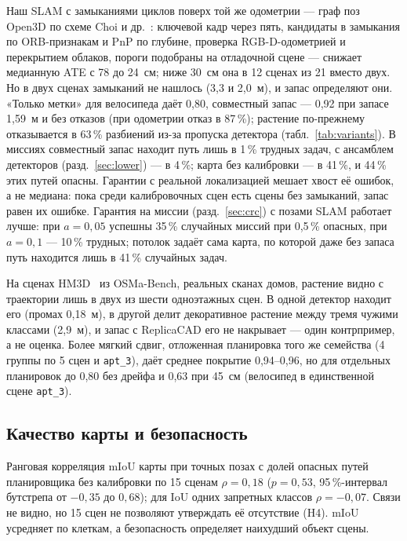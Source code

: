 Наш SLAM с замыканиями циклов поверх той же одометрии --- граф поз Open3D по схеме Choi и др.~\cite{choi2015}: ключевой кадр через пять, кандидаты в замыкания по ORB-признакам и PnP по глубине, проверка RGB-D-одометрией и перекрытием облаков, пороги подобраны на отладочной сцене --- снижает медианную ATE с 78 до 24~см; ниже 30~см она в 12 сценах из 21 вместо двух. Но в двух сценах замыканий не нашлось (3,3 и 2,0~м), и запас определяют они. «Только метки» для велосипеда даёт 0,80, совместный запас --- 0,92 при запасе 1,59~м и без отказов (при одометрии отказ в 87\,\%); растение по-прежнему отказывается в 63\,\% разбиений из-за пропуска детектора (табл.~\ref{tab:variants}). В миссиях совместный запас находит путь лишь в 1\,\% трудных задач, с ансамблем детекторов (разд.~\ref{sec:lower}) --- в 4\,\%; карта без калибровки --- в 41\,\%, и 44\,\% этих путей опасны. Гарантии с реальной локализацией мешает хвост её ошибок, а не медиана: пока среди калибровочных сцен есть сцены без замыканий, запас равен их ошибке. Гарантия на миссии (разд.~\ref{sec:crc}) с позами SLAM работает лучше: при $a = 0{,}05$ успешны 35\,\% случайных миссий при 0,5\,\% опасных, при $a = 0{,}1$ --- 10\,\% трудных; потолок задаёт сама карта, по которой даже без запаса путь находится лишь в 41\,\% случайных задач.

На сценах HM3D~\cite{hm3d} из OSMa-Bench, реальных сканах домов, растение видно с траектории лишь в двух из шести одноэтажных сцен. В одной детектор находит его (промах 0,18~м), в другой делит декоративное растение между тремя чужими классами (2,9~м), и запас с ReplicaCAD его не накрывает --- один контрпример, а не оценка. Более мягкий сдвиг, отложенная планировка того же семейства (4 группы по 5 сцен и \texttt{apt\_3}), даёт среднее покрытие 0,94--0,96, но для отдельных планировок до 0,80 без дрейфа и 0,63 при 45~см (велосипед в единственной сцене \texttt{apt\_3}).

\subsection{Качество карты и безопасность}\label{sec:h4}

Ранговая корреляция mIoU карты при точных позах с долей опасных путей планировщика без калибровки по 15 сценам $\rho = 0{,}18$ ($p = 0{,}53$, 95\,\%-интервал бутстрепа от $-0{,}35$ до $0{,}68$); для IoU одних запретных классов $\rho = -0{,}07$. Связи не видно, но 15 сцен не позволяют утверждать её отсутствие (H4). mIoU усредняет по клеткам, а безопасность определяет наихудший объект сцены.
